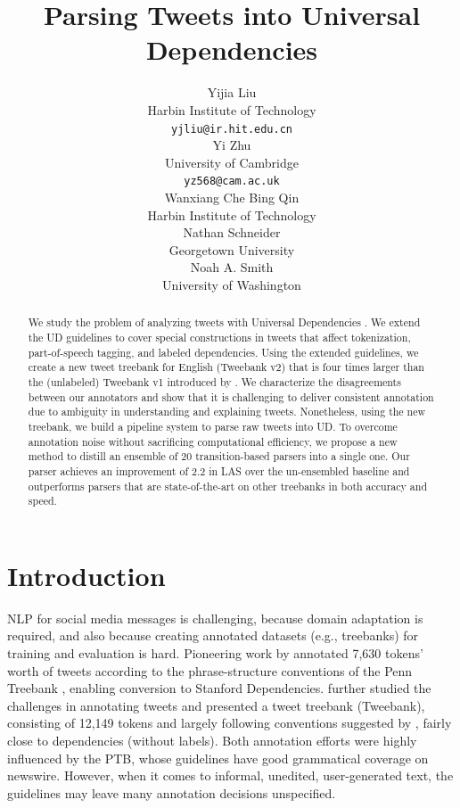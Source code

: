 \documentclass[11pt,a4paper]{article}
\title{Parsing Tweets into Universal Dependencies}
\author{Yijia Liu \\
  Harbin Institute of Technology \\
  {\tt yjliu@ir.hit.edu.cn} \\\And
  Yi Zhu \\
  University of Cambridge \\
  {\tt yz568@cam.ac.uk} \\\AND
  Wanxiang Che \quad Bing Qin\\
  Harbin Institute of Technology\\\And
  Nathan Schneider \\
  Georgetown University \\\And
  Noah A. Smith \\
  University of Washington
  }
\date{}
\begin{document}
\maketitle
\begin{abstract}
We study the problem of analyzing tweets with
Universal Dependencies \citep[UD;][]{NIVRE16.348}. We extend the UD guidelines to cover
special constructions in tweets that affect tokenization,
part-of-speech tagging, and labeled dependencies. Using the extended guidelines, we create
a new tweet treebank for English ({\sc Tweebank v2}) that is four times larger than the (unlabeled) {\sc Tweebank
  v1} introduced by \citet{kong-EtAl:2014:EMNLP2014}. 
We characterize the disagreements between our annotators
and show that it is challenging to deliver
consistent annotation due to ambiguity in
understanding and explaining tweets. Nonetheless, using the new treebank,
we build a pipeline system to parse raw tweets into UD. To overcome 
annotation noise without sacrificing computational efficiency, we propose a new
method to distill an ensemble of 20 transition-based parsers into a single one. Our
parser achieves an improvement of 2.2 in LAS over the un-ensembled baseline 
and outperforms parsers that are state-of-the-art on other treebanks in both accuracy and speed.
\end{abstract}

\section{Introduction}
NLP for social media messages is challenging, because domain
adaptation is required, and also because creating annotated datasets
(e.g., treebanks)
for training and evaluation is hard. 
Pioneering work by \citet{Foster:2011:HPT:2908630.2908634} 
annotated 7,630 tokens' worth of tweets according to the
phrase-structure conventions of the Penn Treebank
\citep[PTB;][]{Marcus93buildinga}, enabling conversion to Stanford Dependencies.
\citet{kong-EtAl:2014:EMNLP2014} further studied the challenges in
annotating tweets and presented a tweet treebank ({\sc Tweebank}),
consisting of 12,149 tokens and largely following conventions
suggested by \citet{schneider-EtAl:2013:LAW7-ID}, fairly close to 
\citet{Yamada03statisticaldependency} dependencies (without labels). 
Both annotation efforts were highly influenced by the PTB, whose guidelines
have good grammatical coverage on newswire. However, when it comes
to informal, unedited, user-generated text, the guidelines may leave
many annotation decisions unspecified.
\end{document}
